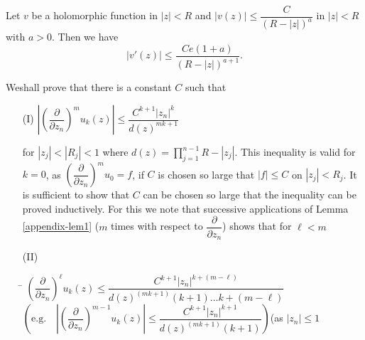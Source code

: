 \begin{lemma}\label{appendix-lem2}
Let $v$ be a holomorphic function in $|z|<R$ and $|v(z)|\leq \dfrac{C}{(R-|z|)^{a}}$ in $|z|<R$ with $a>0$. Then we have
$$
|v'(z)|\leq \dfrac{Ce(1+a)}{(R-|z|)^{a+1}}.
$$
\end{lemma}

We\pageoriginale shall prove that there is a constant $C$ such that
\begin{itemize}
\item[(I)]\hfill $\left|\left(\dfrac{\partial}{\partial z_{n}}\right)^{m}u_{k}(z)\right|\leq \dfrac{C^{k+1}|z_{n}|^{k}}{d(z)^{mk+1}}$\hfill\,

\smallskip
for $|z_{j}|<|R_{j}|<1$ where $d(z)=\prod\limits^{n-1}_{j=1}R-|z_{j}|$. This inequality is valid for $k=0$, as $\left(\dfrac{\partial}{\partial z_{n}}\right)^{m}u_{0}=f$, if $C$ is chosen so large that $|f|\leq C$ on $|z_{j}|<R_{j}$. It is sufficient to show that $C$ can be chosen so large that the inequality can be proved inductively. For this we note that successive applications of Lemma \ref{appendix-lem1} ($m$ times with respect to $\dfrac{\partial}{\partial z_{n}}$) shows that for $\ell <m$

\item[(II)] 
\begin{tabbing}
\= $\left(\dfrac{\partial}{\partial z_{n}}\right)^{\ell}u_{k}(z)\leq \dfrac{C^{k+1}|z_{n}|^{k+(m-\ell)}}{d(z)^{(mk+1)}(k+1)\ldots k+(m-\ell)}$\\[7pt]
\> $\left(\text{e.g.~~ }\left|\left(\dfrac{\partial}{\partial z_{n}}\right)^{m-1}u_{k}(z)\right|\leq \dfrac{C^{k+1}|z_{n}|^{k+1}}{d(z)^{(mk+1)}(k+1)}\right)$\qquad (as $|z_{n}|\leq 1$
\end{tabbing}
\end{itemize}

